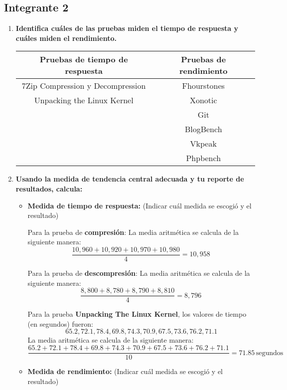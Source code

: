 \documentclass[12pt]{article}
\newcommand{\pl}[1]{\item \textbf{ #1 }}
\begin{document}
\subsection{Integrante 2}

\begin{enumerate}[label=(\arabic{section}.\arabic{subsection}.\arabic{enumi})]
    \pl{Identifica cuáles de las pruebas miden el tiempo de respuesta y cuáles miden el rendimiento.}
    \begin{table}[htb]
        \centering
        \begin{tabular}{|c|c|}
        \hline
        Pruebas de tiempo de respuesta & Pruebas de rendimiento \\
        \hline
        7Zip Compression y Decompression & Fhourstones \\
        \hline
        Unpacking the Linux Kernel & Xonotic \\
        \hline
         & Git \\
        \hline
        & BlogBench \\
        \hline
        & Vkpeak \\
        \hline
        & Phpbench \\
        \hline
        \end{tabular}
    \end{table}\par

    \pl{Usando la medida de tendencia central adecuada y tu reporte de resultados, calcula:}
    \begin{itemize}
        \pl{Medida de tiempo de respuesta:}(Indicar cuál medida se escogió y el resultado)\par
    	Para la prueba de \textbf{compresión}:
La media aritmética se calcula de la siguiente manera:
\[
\frac{10,960 + 10,920 + 10,970 + 10,980}{4} = 10,958 \, 
\]

Para la prueba de \textbf{descompresión}:
La media aritmética se calcula de la siguiente manera:
\[
\frac{8,800 + 8,780 + 8,790 + 8,810}{4} = 8,796 \, 
\]

Para la prueba \textbf{Unpacking The Linux Kernel}, los valores de tiempo (en segundos) fueron:
\[
65.2, 72.1, 78.4, 69.8, 74.3, 70.9, 67.5, 73.6, 76.2, 71.1
\]
La media aritmética se calcula de la siguiente manera:
\[
\frac{65.2 + 72.1 + 78.4 + 69.8 + 74.3 + 70.9 + 67.5 + 73.6 + 76.2 + 71.1}{10} = 71.85 \, \text{segundos}
\]
        \pl{Medida de rendimiento:} (Indicar cuál medida se escogió y el resultado)\par
       

\end{itemize}
\end{enumerate}
\end{document}
